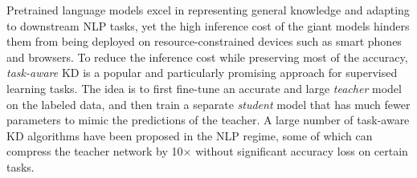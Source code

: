 \documentclass[11pt]{article}
\begin{document}

Pretrained language models excel in representing general knowledge and adapting to downstream NLP tasks, yet the high inference cost of the giant models hinders them from being deployed on resource-constrained devices such as smart phones and browsers.
To reduce the inference cost while preserving most of the accuracy, \emph{task-aware} KD is a popular and particularly promising approach for supervised learning tasks. The idea is to first fine-tune an accurate and large \emph{teacher} model on the labeled data, and then train a separate \emph{student} model that has much fewer parameters to mimic the predictions of the teacher.
A large number of task-aware KD algorithms have been proposed in the NLP regime, some of which can compress the teacher network by 10$\times$ without significant accuracy loss on certain tasks.
\end{document}
